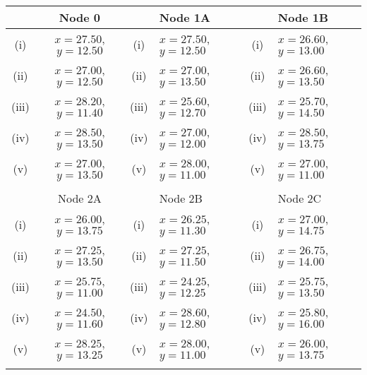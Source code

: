 \documentclass[12pt]{article}
\begin{document}
				
				\normalsize	
				\begin{tabular}{||c|c||c|l||c|l||}
					\hline  & Node 0 &   & Node 1A &  & Node 1B     \\  \hline
					\hline (i) & $x= 27.50$, $y= 12.50$ & (i) & $x= 27.50$, $y = 12.50$ &  (i)  & $x= 26.60$, $y= 13.00$\\  \hline
					\hline (ii)  & $x= 27.00$, $y =12.50 $  &  (ii) & $x= 27.00$, $y = 13.50$ & (ii) & $x= 26.60$, $y = 13.50 $ \\  \hline
					\hline (iii) & $x= 28.20$, $y = 11.40$  & (iii) & $x= 25.60$, $y = 12.70 $ & (iii) & $x= 25.70$, $y = 14.50$ \\  \hline
					\hline (iv)  & $x= 28.50$, $y = 13.50$  &  (iv) & $x= 27.00$, $y = 12.00$  & (iv)  & $x= 28.50$, $y= 13.75$\\  \hline
					\hline (v) & $x= 27.00$, $y = 13.50$ & (v)  & $x= 28.00$, $y= 11.00$ & (v) & $x= 27.00$, $y = 11.00$\\  \hline & & & & & \\
					\hline
		
					\hline  & Node 2A &   & Node 2B &  & Node 2C  \\  \hline
					\hline (i) & $x= 26.00$, $y= 13.75$ & (i)  & $x= 26.25 $, $y = 11.30 $  & (i)  & $x= 27.00$, $y = 14.75$\\  \hline
					\hline (ii)  & $x= 27.25$, $y = 13.50$  &  (ii) &$x= 27.25$, $y = 11.50$ & (ii) & $x= 26.75$, $y = 14.00 $ \\  \hline
					\hline (iii) & $x= 25.75  $, $y = 11.00 $  &  (iii) &$x= 24.25 $, $y = 12.25 $ &  (iii) & $x= 25.75$, $y = 13.50$ \\  \hline
					\hline (iv)  & $x= 24.50$, $y = 11.60 $  & (iv) & $x= 28.60 $, $y = 12.80 $ & (iv)  & $x= 25.80$, $y = 16.00$\\  \hline
					\hline (v) & $x= 28.25 $, $y = 13.25 $ & (v) & $x= 28.00$, $y= 11.00$  &(v) & $x= 26.00$, $y = 13.75$\\  \hline & & & & & \\
					\hline
							\end{tabular}
									\newpage	
\end{document}
